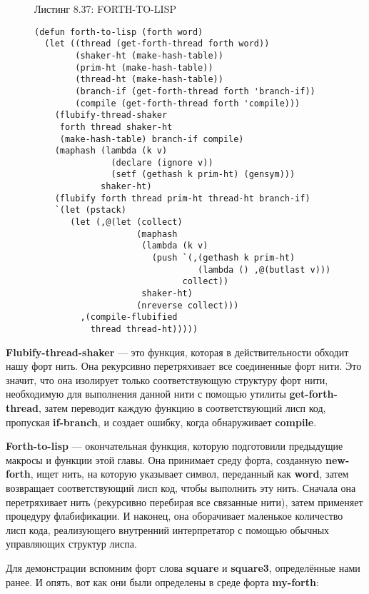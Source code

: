 \begin{figure}Листинг 8.37: FORTH-TO-LISP\label{listing_8.37}
\listbegin
\begin{verbatim}
(defun forth-to-lisp (forth word)
  (let ((thread (get-forth-thread forth word))
        (shaker-ht (make-hash-table))
        (prim-ht (make-hash-table))
        (thread-ht (make-hash-table))
        (branch-if (get-forth-thread forth 'branch-if))
        (compile (get-forth-thread forth 'compile)))
    (flubify-thread-shaker
     forth thread shaker-ht
     (make-hash-table) branch-if compile)
    (maphash (lambda (k v)
               (declare (ignore v))
               (setf (gethash k prim-ht) (gensym)))
             shaker-ht)
    (flubify forth thread prim-ht thread-ht branch-if)
    `(let (pstack)
       (let (,@(let (collect)
                    (maphash
                     (lambda (k v)
                       (push `(,(gethash k prim-ht)
                                (lambda () ,@(butlast v)))
                             collect))
                     shaker-ht)
                    (nreverse collect)))
         ,(compile-flubified
           thread thread-ht)))))
\end{verbatim}
\listend
\end{figure}

\textbf{Flubify-thread-shaker} --- это функция, которая в действительности обходит нашу форт нить. Она рекурсивно перетряхивает все соединенные форт нити. Это значит, что она изолирует только соответствующую структуру форт нити, необходимую для выполнения данной нити с помощью утилиты \textbf{get-forth-thread}, затем переводит каждую функцию в соответствующий лисп код, пропуская \textbf{if-branch}, и создает ошибку, когда обнаруживает \textbf{compile}.

\textbf{Forth-to-lisp} --- окончательная функция, которую подготовили предыдущие макросы и функции этой главы. Она принимает среду форта, созданную \textbf{new-forth}, ищет нить, на которую указывает символ, переданный как \textbf{word}, затем возвращает соответствующий лисп код, чтобы выполнить эту нить. Сначала она перетряхивает нить (рекурсивно перебирая все связанные нити), затем применяет процедуру флабификации. И наконец, она оборачивает маленькое количество лисп кода, реализующего внутренний интерпретатор с помощью обычных управляющих структур лиспа.

Для демонстрации вспомним форт слова \textbf{square} и \textbf{square3}, определённые нами ранее. И опять, вот как они были определены в среде форта \textbf{my-forth}:

